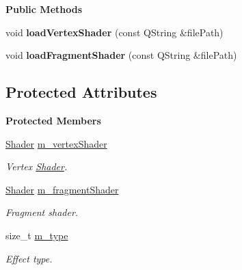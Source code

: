 \begin{Indent}\textbf{ Public Methods}\par
\begin{DoxyCompactItemize}
\item 
\mbox{\label{classrev_1_1_post_processing_effect_stage_a967c95cb2ec3659ff8cf8795124b481f}} 
void {\bfseries load\+Vertex\+Shader} (const Q\+String \&file\+Path)
\item 
\mbox{\label{classrev_1_1_post_processing_effect_stage_a73f99900a0ebd2970d1dd6e778ccffd6}} 
void {\bfseries load\+Fragment\+Shader} (const Q\+String \&file\+Path)
\end{DoxyCompactItemize}
\end{Indent}
\subsection*{Protected Attributes}
\begin{Indent}\textbf{ Protected Members}\par
\begin{DoxyCompactItemize}
\item 
\mbox{\label{classrev_1_1_post_processing_effect_stage_a2e730864f523832b6086e71bd24f9528}} 
\mbox{\hyperlink{classrev_1_1_shader}{Shader}} \mbox{\hyperlink{classrev_1_1_post_processing_effect_stage_a2e730864f523832b6086e71bd24f9528}{m\+\_\+vertex\+Shader}}
\begin{DoxyCompactList}\small\item\em Vertex \mbox{\hyperlink{classrev_1_1_shader}{Shader}}. \end{DoxyCompactList}\item 
\mbox{\label{classrev_1_1_post_processing_effect_stage_adf09204c3b63c1fe3b0d8ece01e3e324}} 
\mbox{\hyperlink{classrev_1_1_shader}{Shader}} \mbox{\hyperlink{classrev_1_1_post_processing_effect_stage_adf09204c3b63c1fe3b0d8ece01e3e324}{m\+\_\+fragment\+Shader}}
\begin{DoxyCompactList}\small\item\em Fragment shader. \end{DoxyCompactList}\item 
\mbox{\label{classrev_1_1_post_processing_effect_stage_a539db6339a34770a7c3bb8e6b51cdade}} 
size\+\_\+t \mbox{\hyperlink{classrev_1_1_post_processing_effect_stage_a539db6339a34770a7c3bb8e6b51cdade}{m\+\_\+type}}
\begin{DoxyCompactList}\small\item\em Effect type. \end{DoxyCompactList}\end{DoxyCompactItemize}
\end{Indent}

